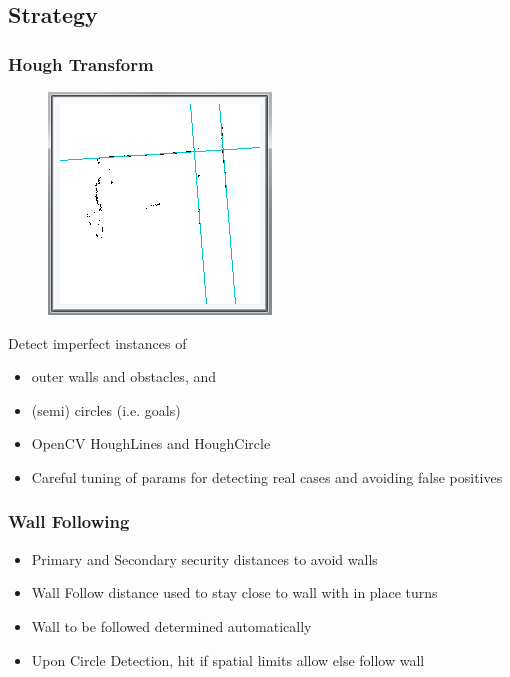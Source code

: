 \documentclass{beamer}
\begin{document}
\subsection{Strategy}

\begin{frame}
\frametitle{Hough Transform}
\begin{figure}
\includegraphics[scale=0.5]{assets/images/HoughTransform.png} 
\end{figure}
Detect imperfect instances of
\begin{itemize}
\item outer walls and obstacles, and
\item (semi) circles (i.e. goals)
\item OpenCV HoughLines and HoughCircle
\item Careful tuning of params for detecting real cases and avoiding false positives
\end{itemize}
\end{frame}


\begin{frame}
\frametitle{Wall Following}
\begin{itemize}
\item Primary and Secondary security distances to avoid walls
\item Wall Follow distance used to stay close to wall with in place turns
\item Wall to be followed determined automatically
\item Upon Circle Detection, hit if spatial limits allow else follow wall
\end{itemize}
\end{frame}
\end{document}
